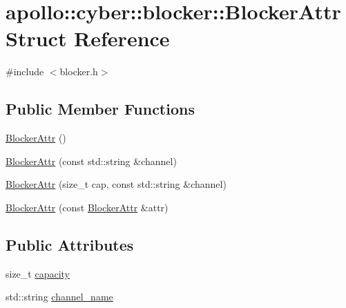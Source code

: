 \hypertarget{structapollo_1_1cyber_1_1blocker_1_1BlockerAttr}{\section{apollo\-:\-:cyber\-:\-:blocker\-:\-:Blocker\-Attr Struct Reference}
\label{structapollo_1_1cyber_1_1blocker_1_1BlockerAttr}
}


{\ttfamily \#include $<$blocker.\-h$>$}

\subsection*{Public Member Functions}
\begin{DoxyCompactItemize}
\item 
\hyperlink{structapollo_1_1cyber_1_1blocker_1_1BlockerAttr_a92b49ec1c15140529af125c4564e74da}{Blocker\-Attr} ()
\item 
\hyperlink{structapollo_1_1cyber_1_1blocker_1_1BlockerAttr_a67b6974da8f485564fba38c798731020}{Blocker\-Attr} (const std\-::string \&channel)
\item 
\hyperlink{structapollo_1_1cyber_1_1blocker_1_1BlockerAttr_a5bcf6983e3209f8e3707640d5c88aaef}{Blocker\-Attr} (size\-\_\-t cap, const std\-::string \&channel)
\item 
\hyperlink{structapollo_1_1cyber_1_1blocker_1_1BlockerAttr_a2eee05c6ef614ac1876aa4cbcdebf7b3}{Blocker\-Attr} (const \hyperlink{structapollo_1_1cyber_1_1blocker_1_1BlockerAttr}{Blocker\-Attr} \&attr)
\end{DoxyCompactItemize}
\subsection*{Public Attributes}
\begin{DoxyCompactItemize}
\item 
size\-\_\-t \hyperlink{structapollo_1_1cyber_1_1blocker_1_1BlockerAttr_a6b3a70ebf5ed158445ca952263d90921}{capacity}
\item 
std\-::string \hyperlink{structapollo_1_1cyber_1_1blocker_1_1BlockerAttr_a10e1a69f1ab4ba0c95ce0584eec4bca1}{channel\-\_\-name}
\end{DoxyCompactItemize}


